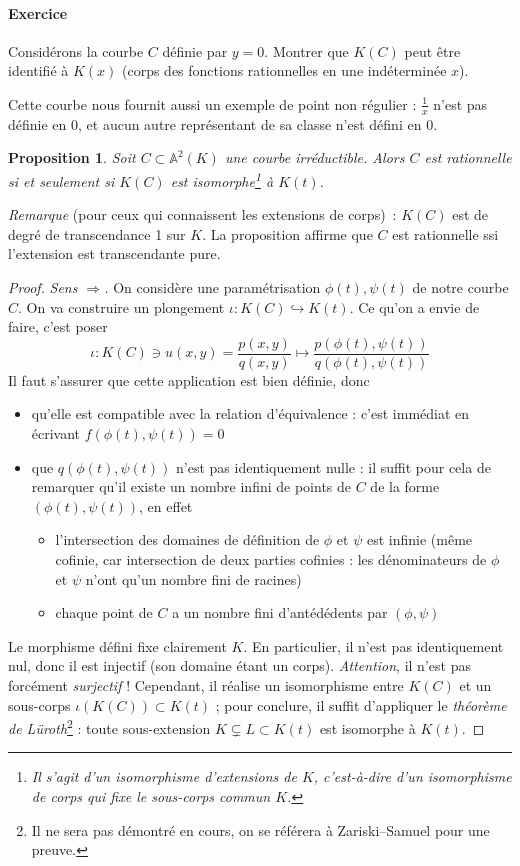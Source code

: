 \documentclass[a4paper, 11pt]{article}
\newtheorem{proposition}[théorème]{Proposition}
\theoremstyle{definition}
\newcommand{\aff}{\mathbb{A}}
\begin{document}
\paragraph{Exercice}
Considérons la courbe $C$ définie par $y = 0$.
Montrer que $K(C)$ peut être identifié à $K(x)$ (corps des fonctions
rationnelles en une indéterminée $x$).

Cette courbe nous fournit aussi un exemple de point non régulier :
$\frac{1}{x}$ n'est pas définie en $0$, et aucun autre représentant de
sa classe n'est défini en $0$.

\begin{proposition}
  Soit $C \subset \aff^2(K)$ une courbe irréductible. Alors $C$ est
  rationnelle si et seulement si $K(C)$ est isomorphe\footnote{Il
    s'agit d'un isomorphisme d'extensions de $K$, c'est-à-dire d'un
    isomorphisme de corps qui fixe le sous-corps commun $K$.} à
  $K(t)$.
\end{proposition}
\textit{Remarque} (pour ceux qui connaissent les extensions de
corps)~: $K(C)$ est de degré de transcendance 1 sur $K$. La
proposition affirme que $C$ est rationnelle ssi l'extension est
transcendante pure.

\begin{proof}
  \textit{Sens $\Rightarrow$.} On considère une paramétrisation
  $\phi(t), \psi(t)$ de notre courbe $C$. On va construire un
  plongement $\iota : K(C) \hookrightarrow K(t)$. Ce qu'on a envie de
  faire, c'est poser
  \[ \iota : K(C) \ni u(x,y) = \frac{p(x,y)}{q(x,y)} \mapsto
  \frac{p(\phi(t),\psi(t))}{q(\phi(t),\psi(t))} \]
  Il faut s'assurer que cette application est bien définie, donc
  \begin{itemize}
  \item qu'elle est compatible avec la relation d'équivalence : c'est
    immédiat en écrivant $f(\phi(t),\psi(t)) = 0$
  \item que $q(\phi(t),\psi(t))$ n'est pas identiquement nulle : il
    suffit pour cela de remarquer qu'il existe un nombre infini de
    points de $C$ de la forme $(\phi(t),\psi(t))$, en effet
    \begin{itemize}
    \item l'intersection des domaines de définition de $\phi$ et
      $\psi$ est infinie (même cofinie, car intersection de deux
      parties cofinies : les dénominateurs de $\phi$ et $\psi$ n'ont
      qu'un nombre fini de racines)
    \item chaque point de $C$ a un nombre fini d'antédédents par
      $(\phi, \psi)$
    \end{itemize}
  \end{itemize}
  Le morphisme défini fixe clairement $K$. En particulier, il n'est
  pas identiquement nul, donc il est injectif (son domaine étant un
  corps). \emph{Attention}, il n'est pas forcément \emph{surjectif} !
  Cependant, il réalise un isomorphisme entre $K(C)$ et un sous-corps
  $\iota(K(C)) \subset K(t)$ ; pour conclure, il suffit d'appliquer le
  \emph{théorème de Lüroth}\footnote{Il ne sera pas démontré en cours,
    on se référera à Zariski--Samuel pour une preuve.} : toute
  sous-extension $K \subsetneq L \subset K(t)$ est isomorphe à $K(t)$.
\end{proof}
\end{document}
